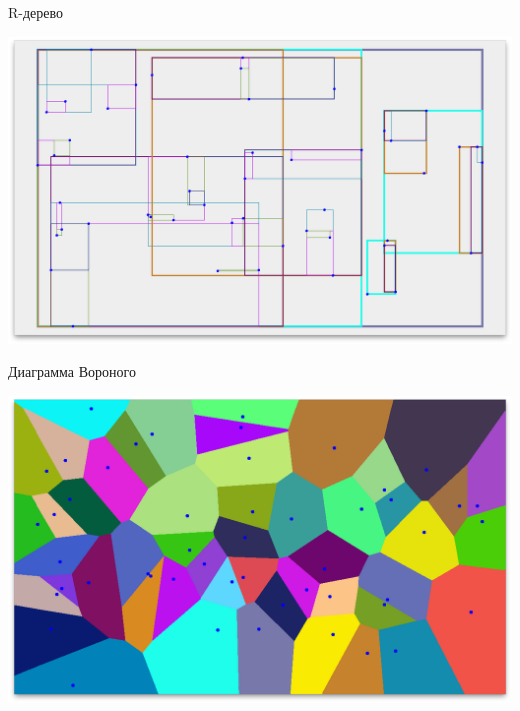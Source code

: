 \documentclass[14pt, fleqn, xcolor={dvipsnames, table}]{beamer}
\begin{document}
        \begin{frame}{R-дерево}
            \begin{center}
	            \includegraphics[scale = 0.295]{r-tree.png}
	        \end{center}  
        \end{frame}
        
        \begin{frame}{Диаграмма Вороного}
            \begin{center}
	            \includegraphics[scale=0.295]{voronoi-1.png}
	        \end{center}       
        \end{frame}
        
\end{document}
